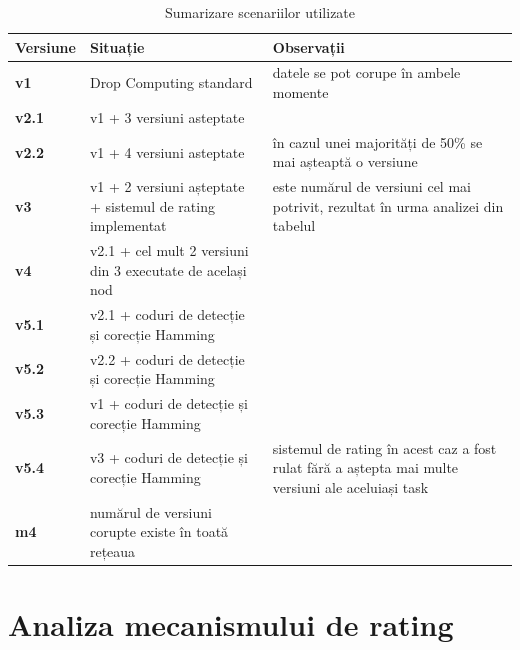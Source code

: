 \documentclass[12pt,a4paper]{report}
\begin{document}
\begin{table}[th]\small\linespread{1}
\caption{Sumarizare scenariilor utilizate}
\label{tab:scenarii}
\begin{tabular}{l >{\raggedright\arraybackslash}p{8cm} >{\raggedright\arraybackslash}p{4cm}}
\textbf{Versiune} & \textbf{Situație} & \textbf{Observații} \\\hline
\textbf{v1} & Drop Computing standard &datele se pot corupe în ambele momente \\\hline
\textbf{v2.1} & v1 + 3 versiuni asteptate& \\\hline
\textbf{v2.2} & v1 + 4 versiuni asteptate &în cazul unei majorități de 50\% se mai așteaptă o versiune \\\hline
\textbf{v3} & v1 + 2 versiuni așteptate + sistemul de rating implementat &2 este numărul de versiuni cel mai potrivit, rezultat în urma analizei din tabelul  \\\hline
\textbf{v4} & v2.1 + cel mult 2 versiuni din 3 executate de același nod& \\\hline
\textbf{v5.1} & v2.1 + coduri de detecție și corecție Hamming& \\\hline
\textbf{v5.2} & v2.2 + coduri de detecție și corecție Hamming& \\\hline
\textbf{v5.3} & v1 + coduri de detecție și corecție Hamming& \\\hline
\textbf{v5.4} & v3 + coduri de detecție și corecție Hamming& sistemul de rating în acest caz a fost rulat fără a aștepta mai multe versiuni ale aceluiași task \\\hline
\textbf{m4} & numărul de versiuni corupte existe în toată rețeaua &\\
\hline
\end{tabular}
\end{table}
\newpage
\section{Analiza mecanismului de rating}
\end{document}

